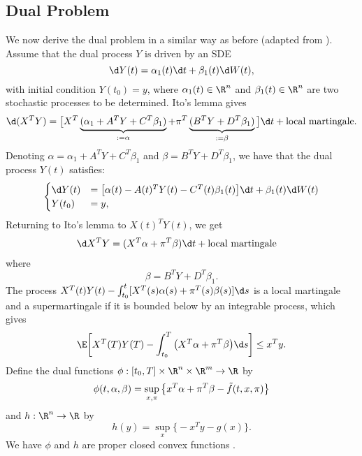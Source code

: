 \subsection{Dual Problem}
We now derive the dual problem in a similar way as before (adapted from \cite{Constrained_Quadratic_Risk_Minimisation_Via_FBSDEs}). Assume that the dual process $Y$ is driven by an SDE
\begin{equation*}
    \d Y(t) = \alpha_1(t) \d t + \beta_1(t) \d W(t),
\end{equation*}
with initial condition $Y(t_0) = y$, where $\alpha_1(t) \in \R^n$ and $\beta_1(t) \in \R^n$ are two stochastic processes to be determined. Ito's lemma gives
\begin{equation*}
    \d (X^T Y) = \big[ X^T \underbrace{(\alpha_1 + A^T Y + C^T \beta_1)}_{:= \alpha} + \pi^T \underbrace{(B^T Y + D^T \beta_1)}_{:= \beta}\big] \d t + \text{local martingale}.
\end{equation*}
Denoting $\alpha = \alpha_1 + A^T Y + C^T \beta_1$ and $\beta = B^T Y + D^T \beta_1$, we have that the dual process $Y(t)$ satisfies:
\begin{equation}
    \begin{cases}
        \d Y(t) &= \big[ \alpha(t) - A(t)^T Y(t) - C^T(t) \beta_1(t)\big]\d t + \beta_1(t) \d W(t)\\
        Y(t_0) &= y, \label{eq: constrained_y_sde}
    \end{cases}
\end{equation}
Returning to Ito's lemma to $X(t)^T Y(t)$, we get
\begin{align*}
    \d X^T Y &= (X^T \alpha + \pi^T \beta ) \d t + \text{local martingale}
\end{align*}
where
\begin{equation}
    \beta = B^T Y +  D^T \beta_1. \label{eq: constrained_beta_relation}
\end{equation}
The process $X^T(t)Y(t) - \int_{t_0}^t [X^T(s) \alpha(s) + \pi^T(s) \beta(s)] \d s$ is a local martingale and a supermartingale if it is bounded below by an integrable process, which gives 
\begin{equation}
    \E \bigg[ X^T(T) Y(T) - \int_{t_0}^T \big(X^T \alpha + \pi^T \beta \big) \d s \bigg] \le x^T y. \label{eq: constrained_dual_1}
\end{equation}
Define the dual functions $\phi : [t_0, T] \times \R^n \times \R^m \to \R$ by
\begin{equation}
    \phi(t, \alpha, \beta) = \sup_{x, \pi} \big\{x^T \alpha + \pi^T \beta - \tilde{f}\/(t, x, \pi) \big\} \label{eq: constrained_phi_1}
\end{equation}
and $h: \R^n \to \R$ by
\begin{equation}
    h(y) = \sup_x \big\{-x^T y - g(x)\big\}. 
    \label{eq: constrained_h_1}
\end{equation}
We have $\phi$ and $h$ are proper closed convex functions \cite[Proposition 1.1.6, Proposition 1.6.1]{Convex_Optimisation_Theory}.\\

